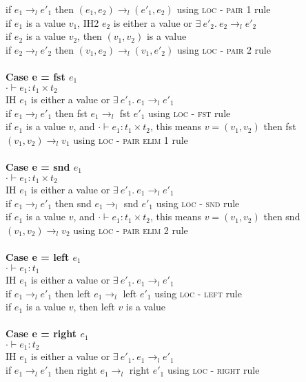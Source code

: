 \documentclass{article}
\begin{document}
if $e_1 \to_l e'_1$ then $(e_1,e_2) \to_l (e'_1, e_2)$ using \textsc{loc - pair 1} rule\\
if $e_1$ is a value $v_1$, IH2 $e_2$ is either a value or $  \exists \ e'_2.\ e_2 \to_l e'_2 $ \\
if $e_2$ is a value $v_2$, then $(v_1,v_2)$ is a value \\
if $e_2 \to_l e'_2$ then $(v_1,e_2) \to_l (v_1,e'_2)$ using \textsc{loc - pair 2} rule \\ \\
\textbf{Case e = fst $e_1$} \\
$\cdot \vdash e_1: t_1 \times t_2$\\
IH $e_1$ is either a value or $  \exists \ e'_1.\ e_1 \to_l e'_1 $ \\
if $e_1 \to_l e'_1$ then fst $e_1 \to_l $ fst $e'_1$ using \textsc{loc - fst} rule\\
if $e_1$ is a value $v$, and $\cdot \vdash e_1: t_1 \times t_2$, this means $v = (v_1, v_2)$ then fst $(v_1, v_2) \to_l v_1$ using \textsc{loc - pair elim 1} rule\\ \\
\textbf{Case e = snd $e_1$} \\
$\cdot \vdash e_1: t_1 \times t_2$\\
IH $e_1$ is either a value or $  \exists \ e'_1.\ e_1 \to_l e'_1 $ \\
if $e_1 \to_l e'_1$ then snd $e_1 \to_l $ snd $e'_1$ using \textsc{loc - snd} rule\\
if $e_1$ is a value $v$, and $\cdot \vdash e_1: t_1 \times t_2$, this means $v = (v_1, v_2)$ then snd $(v_1, v_2) \to_l v_2$ using \textsc{loc - pair elim 2} rule\\ \\
\textbf{Case e = left $e_1$} \\
$\cdot \vdash e_1: t_1$\\
IH $e_1$ is either a value or $  \exists \ e'_1.\ e_1 \to_l e'_1 $ \\
if $e_1 \to_l e'_1$ then left $e_1 \to_l$ left $e'_1$ using \textsc{loc - left} rule\\
if $e_1$ is a value $v$, then left $v$ is a value\\ \\
\textbf{Case e = right $e_1$} \\
$\cdot \vdash e_1: t_2$\\
IH $e_1$ is either a value or $  \exists \ e'_1.\ e_1 \to_l e'_1 $ \\
if $e_1 \to_l e'_1$ then right $e_1 \to_l$ right $e'_1$ using \textsc{loc - right} rule\\
\end{document}
